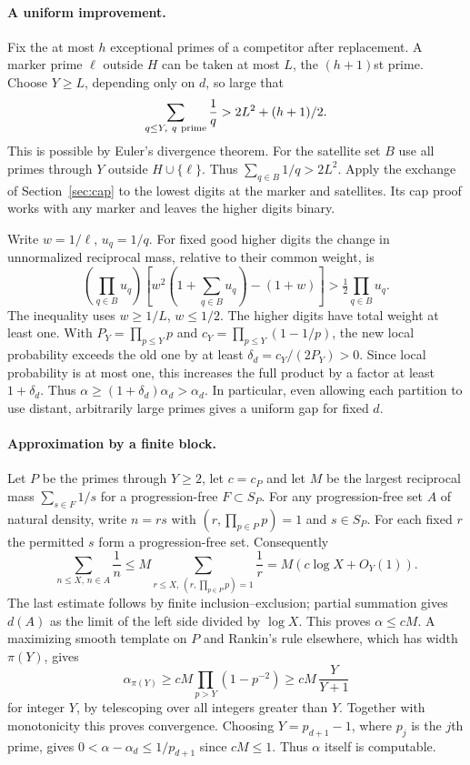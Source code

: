 \paragraph{A uniform improvement.}
Fix the at most $h$ exceptional primes of a competitor after replacement.
A marker prime $\ell$ outside $H$ can be taken at most $L$, the
$(h+1)$st prime. Choose $Y\ge L$, depending only on $d$, so large that
\[
          \sum_{q\le Y,\ q\ {\rm prime}}\frac1q
                > 2L^2+(h+1)/2 .
\]
This is possible by Euler's divergence theorem. For the satellite set
$B$ use all primes through $Y$ outside $H\cup\{\ell\}$. Thus
$\sum_{q\in B}1/q>2L^2$. Apply the exchange of Section~\ref{sec:cap} to the lowest digits at the marker and satellites. Its cap proof works with any marker and leaves the higher digits binary.

Write $w=1/\ell$, $u_q=1/q$. For fixed good higher digits the change
in unnormalized reciprocal mass, relative to their common weight, is
\[
   \left(\prod_{q\in B}u_q\right)
       \left[w^2\left(1+\sum_{q\in B}u_q\right)-(1+w)\right]
      >\tfrac12\prod_{q\in B}u_q .
\]
The inequality uses $w\ge1/L$, $w\le1/2$. The higher digits have
total weight at least one. With $P_Y=\prod_{p\le Y}p$ and
$c_Y=\prod_{p\le Y}(1-1/p)$, the new local probability exceeds the
old one by at least $\delta_d=c_Y/(2P_Y)>0$. Since local probability
is at most one, this increases the full product by a factor at least
$1+\delta_d$. Thus $\alpha\ge(1+\delta_d)\alpha_d>\alpha_d$.
In particular, even allowing each partition to use distant, arbitrarily
large primes gives a uniform gap for fixed $d$.

\paragraph{Approximation by a finite block.}
Let $P$ be the primes through $Y\ge2$, let $c=c_P$ and let $M$ be the
largest reciprocal mass $\sum_{s\in F}1/s$ for a progression-free
$F\subset S_P$. For any progression-free set $A$ of natural density,
write $n=rs$ with $(r,\prod_{p\in P}p)=1$ and $s\in S_P$.
For each fixed $r$ the permitted $s$ form a progression-free set.
Consequently
\[
 \sum_{n\le X,\,n\in A}\frac1n
  \le M\sum_{r\le X,\,(r,\prod_{p\in P}p)=1}\frac1r
  =M(c\log X+O_Y(1)).
\]
The last estimate follows by finite inclusion--exclusion; partial
summation gives $d(A)$ as the limit of the left side divided by
$\log X$. This proves $\alpha\le cM$. A maximizing smooth template
on $P$ and Rankin's rule elsewhere, which has width $\pi(Y)$, gives
\[
  \alpha_{\pi(Y)}\ge cM\prod_{p>Y}(1-p^{-2})
       \ge cM\,\frac{Y}{Y+1}
\]
for integer $Y$, by telescoping over all integers greater than $Y$.
Together with monotonicity this proves convergence. Choosing $Y=p_{d+1}-1$, where $p_j$ is the $j$th prime, gives $0<\alpha-\alpha_d\le 1/p_{d+1}$ since $cM\le1$. Thus $\alpha$ itself is computable.


